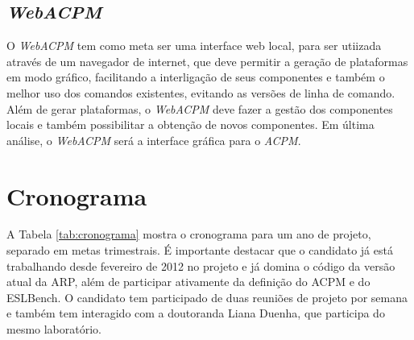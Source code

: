 \documentclass[10pt,a4paper]{article}
\begin{document}
\subsection{\textit{WebACPM}}
O \textit{WebACPM} tem como meta ser uma interface web local, para ser
utiizada através de um navegador de internet, que deve permitir a
geração de plataformas em modo gráfico, facilitando a interligação de
seus componentes e também o melhor uso dos comandos existentes,
evitando as versões de linha de comando. Além
de gerar plataformas, o \textit{WebACPM} deve fazer a gestão dos componentes
locais e também possibilitar a obtenção de novos componentes. Em
última análise, o \textit{WebACPM} será a interface gráfica para o
\textit{ACPM}.


\section{Cronograma}

A Tabela \ref{tab:cronograma} mostra o cronograma para um ano de
projeto, separado em metas trimestrais. É importante destacar que o
candidato já está trabalhando desde fevereiro de 2012 no projeto e já
domina o código da versão atual da ARP, além de participar ativamente
da definição do ACPM e do ESLBench. O candidato tem participado de
duas reuniões de projeto por semana e também tem interagido com a
doutoranda Liana Duenha, que participa do mesmo laboratório.
\end{document}
